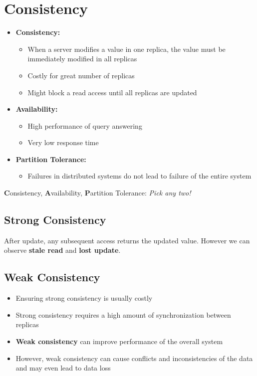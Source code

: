 \chapter{Consistency}
\begin{itemize}
    \item \textbf{Consistency:}
    \begin{itemize}
        \item When a server modifies a value in one replica, the value must be immediately modified in all replicas
        \item Costly for great number of replicas
        \item Might block a read access until all replicas are updated 
    \end{itemize}
    \item \textbf{Availability:}
    \begin{itemize}
        \item High performance of query answering
        \item Very low response time
    \end{itemize}
    \item \textbf{Partition Tolerance:}
    \begin{itemize}
        \item Failures in distributed systems do not lead to failure of the entire system
    \end{itemize}
\end{itemize}

\begin{tcolorbox}[title=\textbf{CAP conjecture}]
\textbf{C}onsistency, \textbf{A}vailability, \textbf{P}artition Tolerance: \textit{Pick any two!}
\end{tcolorbox}

\section{Strong Consistency}
After update, any subsequent access returns the updated value. However we can observe \textbf{stale read} and \textbf{lost update}.

\section{Weak Consistency}
\begin{itemize}
    \item Ensuring strong consistency is usually costly
    \item Strong consistency requires a high amount of synchronization between replicas
    \item \textbf{Weak consistency} can improve performance of the overall system
    \item However, weak consistency can cause conflicts and inconsistencies of the data and may even lead to data loss
\end{itemize}

